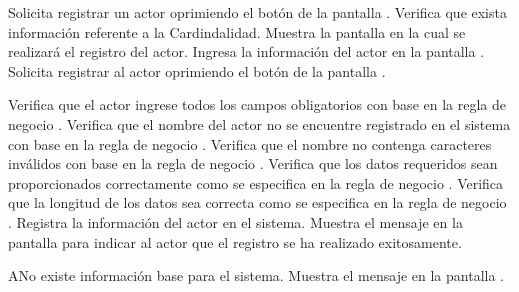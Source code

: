 \begin{UCtrayectoria}
    \UCpaso[\UCactor] Solicita registrar un actor oprimiendo el botón  de la pantalla .
    \UCpaso[\UCsist] Verifica que exista información referente a la Cardindalidad. 
    \UCpaso[\UCsist] Muestra la pantalla  en la cual se realizará el registro del actor. 
    \UCpaso[\UCactor] Ingresa la información del actor en la pantalla . \label{cu7.1:ingresaDatos}
    \UCpaso[\UCactor] Solicita registrar al actor oprimiendo el botón  de la pantalla . 
    
    \UCpaso[\UCsist] Verifica que el actor ingrese todos los campos obligatorios con base en la regla de negocio  . 
    \UCpaso[\UCsist] Verifica que el nombre del actor no se encuentre registrado en el sistema con base en la regla de negocio  . 
    \UCpaso[\UCsist] Verifica que el nombre no contenga caracteres inválidos con base en la regla de negocio . 
    \UCpaso[\UCsist] Verifica que los datos requeridos sean proporcionados correctamente como se especifica en la regla de negocio .  
    \UCpaso[\UCsist] Verifica que la longitud de los datos sea correcta como se especifica en la regla de negocio . 
    \UCpaso[\UCsist] Registra la información del actor en el sistema.
    \UCpaso[\UCsist] Muestra el mensaje  en la pantalla  
    para indicar al actor que el registro se ha realizado exitosamente.
 \end{UCtrayectoria}
 \begin{UCtrayectoriaA}{A}{No existe información base para el sistema.}
    \UCpaso[\UCsist] Muestra el mensaje  en la pantalla .
 \end{UCtrayectoriaA}
